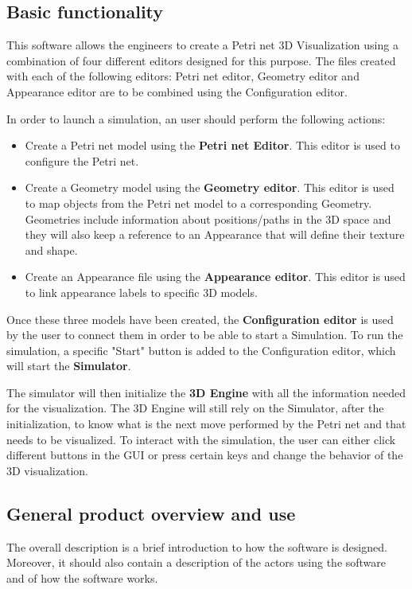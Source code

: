 \newpage

\subsection{Basic functionality}
This software allows the engineers to create a Petri net 3D Visualization using a combination of four different editors designed for this purpose.
The files created with each of the following editors: \newline
Petri net editor, Geometry editor and Appearance editor are to be combined using the Configuration editor. 

In order to launch a simulation, an user should perform the following actions:

\begin{itemize}
  \item Create a Petri net model using the \textbf{Petri net Editor}. This editor is used to configure the Petri net.
  \item Create a Geometry model using the \textbf{Geometry editor}. This editor is used to map objects from the Petri net model to a corresponding Geometry. Geometries include information about positions/paths in the 3D space and they will also keep a reference to an Appearance that will define their texture and shape.
  \item Create an Appearance file using the \textbf{Appearance editor}. This editor is used to link appearance labels to specific 3D models.  
\end{itemize}

Once these three models have been created, the \textbf{Configuration editor} is used by the user to connect them in order to be able to start a Simulation. 
To run the simulation, a specific "Start" button is added to the Configuration editor, which will start the \textbf{Simulator}.
\newline

The simulator will then initialize the \textbf{3D Engine} with all the information needed for the visualization. The 3D Engine will still rely on the Simulator, after the initialization, to know what is the next move performed by the Petri net and that needs to be visualized. \newline
To interact with the simulation, the user can either click different buttons in the GUI or press certain keys and change the behavior of the 3D visualization.

\subsection{General product overview and use}
The overall description is a brief introduction to how the software is designed. Moreover, it should also contain a description of the actors using the software and of how the software works. \newline

